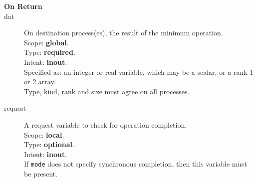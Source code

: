 \begin{description}
\item[\bf On Return]
\item[dat] On destination process(es), the result of the minimum operation.\\
Scope: {\bf global}.\\
Type: {\bf required}.\\
Intent: {\bf inout}.\\
Specified as: an integer  or  real variable, which may be a
scalar, or a rank 1 or 2 array. \\
Type, kind, rank and size must agree on all processes.
\item[request] A request variable to check for operation completion.\\
Scope: {\bf local}.\\
Type: {\bf optional}.\\
Intent: {\bf inout}.\\
If \verb|mode| does not specify synchronous completion, then this
variable must be present.
\end{description}


